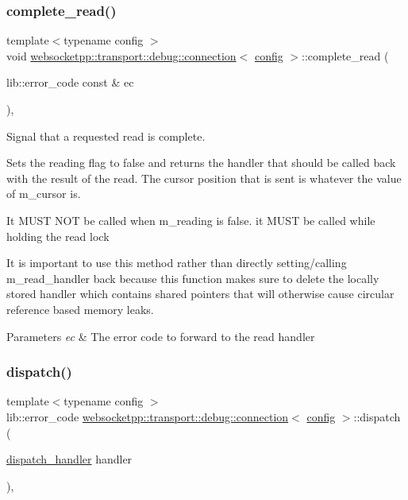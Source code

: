 \subsubsection{\texorpdfstring{complete\+\_\+read()}{complete\_read()}}
{\footnotesize\ttfamily template$<$typename config $>$ \\
void \mbox{\hyperlink{classwebsocketpp_1_1transport_1_1debug_1_1connection}{websocketpp\+::transport\+::debug\+::connection}}$<$ \mbox{\hyperlink{classconfig}{config}} $>$\+::complete\+\_\+read (\begin{DoxyParamCaption}\item[{lib\+::error\+\_\+code const \&}]{ec }\end{DoxyParamCaption})\hspace{0.3cm}{\ttfamily [inline]}, {\ttfamily [protected]}}



Signal that a requested read is complete. 

Sets the reading flag to false and returns the handler that should be called back with the result of the read. The cursor position that is sent is whatever the value of m\+\_\+cursor is.

It M\+U\+ST N\+OT be called when m\+\_\+reading is false. it M\+U\+ST be called while holding the read lock

It is important to use this method rather than directly setting/calling m\+\_\+read\+\_\+handler back because this function makes sure to delete the locally stored handler which contains shared pointers that will otherwise cause circular reference based memory leaks.


\begin{DoxyParams}{Parameters}
{\em ec} & The error code to forward to the read handler \\
\hline
\end{DoxyParams}
\mbox{\label{classwebsocketpp_1_1transport_1_1debug_1_1connection_a4cac08eb7b8646fc042d465b3bb645a6}} 
\subsubsection{\texorpdfstring{dispatch()}{dispatch()}}
{\footnotesize\ttfamily template$<$typename config $>$ \\
lib\+::error\+\_\+code \mbox{\hyperlink{classwebsocketpp_1_1transport_1_1debug_1_1connection}{websocketpp\+::transport\+::debug\+::connection}}$<$ \mbox{\hyperlink{classconfig}{config}} $>$\+::dispatch (\begin{DoxyParamCaption}\item[{\mbox{\hyperlink{namespacewebsocketpp_1_1transport_a6658447b2e10f4c712dd792aad0e0c78}{dispatch\+\_\+handler}}}]{handler }\end{DoxyParamCaption})\hspace{0.3cm}{\ttfamily [inline]}, {\ttfamily [protected]}}



